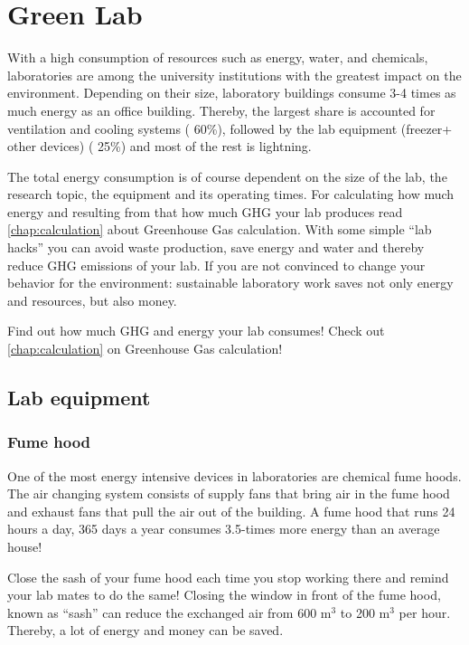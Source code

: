 
\chapter{Green Lab}\label{chap:lab}

With a high consumption of resources such as energy, water, and chemicals, laboratories are among the university institutions with the greatest impact on the environment. Depending on their size, laboratory buildings consume 3-4 times as much energy as an office building. Thereby, the largest share is accounted for ventilation and cooling systems (\raisebox{-0.9ex}{\~{ }} 60\%), followed by the lab equipment (freezer+ other devices) (\raisebox{-0.9ex}{\~{ }} 25\%) and most of the rest is lightning. \cite{GreenHarvard}

The total energy consumption is of course dependent on the size of the lab, the research topic, the equipment and its operating times. For calculating how much energy and resulting from that how much GHG your lab produces read \cref{chap:calculation} about Greenhouse Gas calculation. 
With some simple “lab hacks” you can avoid waste production, save energy and water and thereby reduce GHG emissions of your lab. 
If you are not convinced to change your behavior for the environment: sustainable laboratory work saves not only energy and resources, but also money.

\begin{suggest}{Find out how much GHG and energy your lab consumes!}
	Check out \cref{chap:calculation} on Greenhouse Gas calculation!
\end{suggest}

\section{Lab equipment}

\subsection{Fume hood}
One of the most energy intensive devices in laboratories are chemical fume hoods. The air changing system consists of supply fans that bring air in the fume hood and exhaust fans that pull the air out of the building.  A fume hood that runs 24 hours a day, 365 days a year consumes 3.5-times more energy than an average house! 

\begin{suggest}{Close the sash of your fume hood each time you stop working there and remind your lab mates to do the same!}
	Closing the window in front of the fume hood, known as “sash” can reduce the exchanged air from 600 m$^{3}$ to 200 m$^{3}$ per hour. Thereby, a lot of energy and money can be saved.
\end{suggest}


